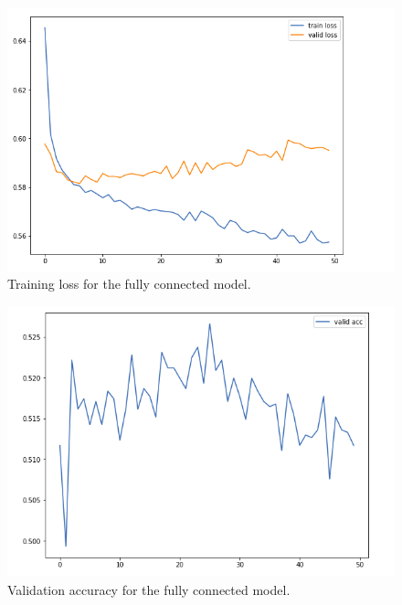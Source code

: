 \documentclass[a4paper]{article}
\begin{document}
\begin{figure} 
\includegraphics[scale=0.35]{img/experiment1.png}
\caption{Training loss for the fully connected model. }
\label{fig:fcloss}
\end{figure}
\begin{figure} 
\includegraphics[scale=0.35]{img/acc1.png}
\caption{Validation accuracy for the fully connected model. }
\label{fig:fcacc}
\end{figure}
\end{document}
